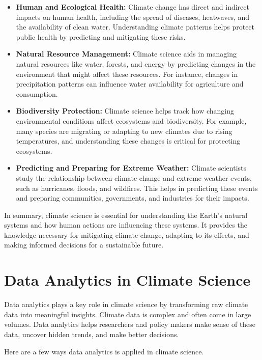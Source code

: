 \begin{itemize}
    \item \textbf{Human and Ecological Health:} Climate change has direct and indirect impacts on human health, including the spread of diseases, heatwaves, and the availability of clean water. Understanding climate patterns helps protect public health by predicting and mitigating these risks.
    \item \textbf{Natural Resource Management:} Climate science aids in managing natural resources like water, forests, and energy by predicting changes in the environment that might affect these resources. For instance, changes in precipitation patterns can influence water availability for agriculture and consumption.
    \item \textbf{Biodiversity Protection:} Climate science helps track how changing environmental conditions affect ecosystems and biodiversity. For example, many species are migrating or adapting to new climates due to rising temperatures, and understanding these changes is critical for protecting ecosystems.
    \item \textbf{Predicting and Preparing for Extreme Weather:} Climate scientists study the relationship between climate change and extreme weather events, such as hurricanes, floods, and wildfires. This helps in predicting these events and preparing communities, governments, and industries for their impacts.
\end{itemize}

In summary, climate science is essential for understanding the Earth’s natural systems and how human actions are influencing these systems. It provides the knowledge necessary for mitigating climate change, adapting to its effects, and making informed decisions for a sustainable future.

\section*{Data Analytics in Climate Science}

Data analytics plays a key role in climate science by transforming raw climate data into meaningful insights. Climate data is complex and often come in large volumes. Data analytics helps researchers and policy makers make sense of these data, uncover hidden trends, and make better decisions.

Here are a few ways data analytics is applied in climate science.

